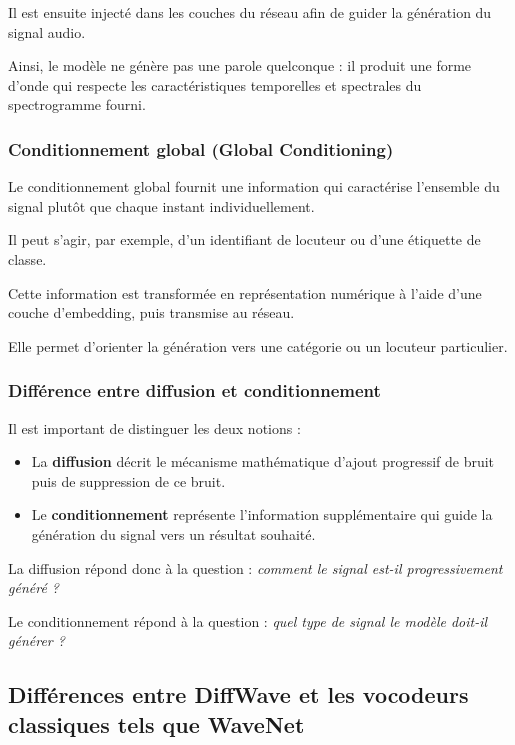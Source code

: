 Il est ensuite injecté dans les couches du réseau
afin de guider la génération du signal audio.

Ainsi, le modèle ne génère pas une parole quelconque :
il produit une forme d'onde qui respecte les
caractéristiques temporelles et spectrales du
spectrogramme fourni.

\subsubsection{Conditionnement global (Global Conditioning)}

Le conditionnement global fournit une information
qui caractérise l'ensemble du signal plutôt que chaque
instant individuellement.

Il peut s'agir, par exemple, d'un identifiant de
locuteur ou d'une étiquette de classe.

Cette information est transformée en représentation
numérique à l'aide d'une couche d'embedding, puis
transmise au réseau.

Elle permet d'orienter la génération vers une catégorie
ou un locuteur particulier.

\subsubsection{Différence entre diffusion et conditionnement}

Il est important de distinguer les deux notions :

\begin{itemize}
    \item La \textbf{diffusion} décrit le mécanisme
    mathématique d'ajout progressif de bruit puis de
    suppression de ce bruit.

    \item Le \textbf{conditionnement} représente
    l'information supplémentaire qui guide la génération
    du signal vers un résultat souhaité.
\end{itemize}

La diffusion répond donc à la question :
\textit{comment le signal est-il progressivement généré ?}

Le conditionnement répond à la question :
\textit{quel type de signal le modèle doit-il générer ?}

\subsection{Différences entre DiffWave et les vocodeurs
classiques tels que WaveNet}

